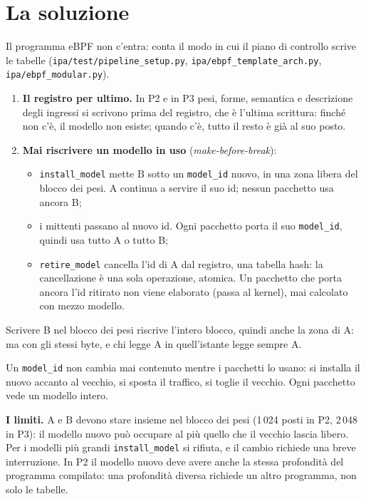 \documentclass[11pt,a4paper,oneside]{report}
\begin{document}
\section{La soluzione}

Il programma eBPF non c'entra: conta il modo in cui il piano di controllo
scrive le tabelle (\texttt{ipa/test/pipeline\_setup.py},
\texttt{ipa/ebpf\_template\_arch.py}, \texttt{ipa/ebpf\_modular.py}).

\begin{enumerate}
  \item \textbf{Il registro per ultimo.} In P2 e in P3 pesi, forme, semantica e
        descrizione degli ingressi si scrivono prima del registro, che è l'ultima
        scrittura: finché non c'è, il modello non esiste; quando c'è, tutto il
        resto è già al suo posto.
  \item \textbf{Mai riscrivere un modello in uso} (\emph{make-before-break}):
        \begin{itemize}
          \item \texttt{install\_model} mette B sotto un \texttt{model\_id}
                nuovo, in una zona libera del blocco dei pesi. A continua a
                servire il suo id; nessun pacchetto usa ancora B;
          \item i mittenti passano al nuovo id. Ogni pacchetto porta il suo
                \texttt{model\_id}, quindi usa tutto A o tutto B;
          \item \texttt{retire\_model} cancella l'id di A dal registro, una
                tabella hash: la cancellazione è una sola operazione, atomica.
                Un pacchetto che porta ancora l'id ritirato non viene elaborato
                (passa al kernel), mai calcolato con mezzo modello.
        \end{itemize}
\end{enumerate}

Scrivere B nel blocco dei pesi riscrive l'intero blocco, quindi anche la zona di
A: ma con gli stessi byte, e chi legge A in quell'istante legge sempre A.

\begin{lezione}
Un \texttt{model\_id} non cambia mai contenuto mentre i pacchetti lo usano: si
installa il nuovo accanto al vecchio, si sposta il traffico, si toglie il vecchio.
Ogni pacchetto vede un modello intero.
\end{lezione}

\textbf{I limiti.} A e B devono stare insieme nel blocco dei pesi (1\,024 posti
in P2, 2\,048 in P3): il modello nuovo può occupare al più quello che il vecchio
lascia libero. Per i modelli più grandi \texttt{install\_model} si rifiuta, e il cambio richiede una breve
interruzione. In P2 il modello nuovo deve avere anche la stessa profondità del
programma compilato: una profondità diversa richiede un altro programma, non solo
le tabelle.
\end{document}
